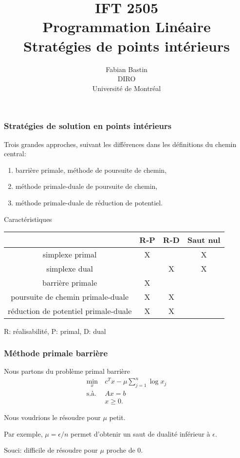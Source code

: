 \documentclass[usepdftitle=false]{beamer}
\title[IFT2505]{IFT 2505\\Programmation Linéaire\\Stratégies de points intérieurs}
\author[Fabian Bastin]{Fabian Bastin\\DIRO\\Université de Montréal\\\mbox{}}
\date{}
\begin{document}
\frame{\titlepage}


\begin{frame}
\frametitle{Stratégies de solution en points intérieurs}

Trois grandes approches, suivant les différences dans les définitions du chemin central:
\begin{enumerate}
\item
barrière primale, méthode de poursuite de chemin,
\item
méthode primale-duale de poursuite de chemin,
\item
méthode primale-duale de réduction de potentiel.
\end{enumerate}

\mbox{}

Caractéristiques
\begin{tabular}{c|ccc}
& R-P & R-D & Saut nul \\
\hline
simplexe primal & X & & X \\
simplexe dual & & X & X\\
barrière primale & X & & \\
poursuite de chemin primale-duale & X & X & \\
réduction de potentiel primale-duale & X & X & \\
\end{tabular}

R: réalisabilité, P: primal, D: dual

\end{frame}

\begin{frame}
\frametitle{Méthode primale barrière}

Nous partons du problème primal barrière
\begin{align*}
\min_x \ & c^Tx - \mu \sum_{j = 1}^n \log x_j \\
\mbox{s.à. } & Ax = b \\
& x \geq 0.
\end{align*}

\mbox{}

Nous voudrions le résoudre pour $\mu$ petit.

\mbox{}

Par exemple, $\mu = \epsilon/n$ permet d'obtenir un saut de dualité inférieur à $\epsilon$.

\mbox{}

Souci: difficile de résoudre pour $\mu$ proche de 0.

\end{frame}
\end{document}
